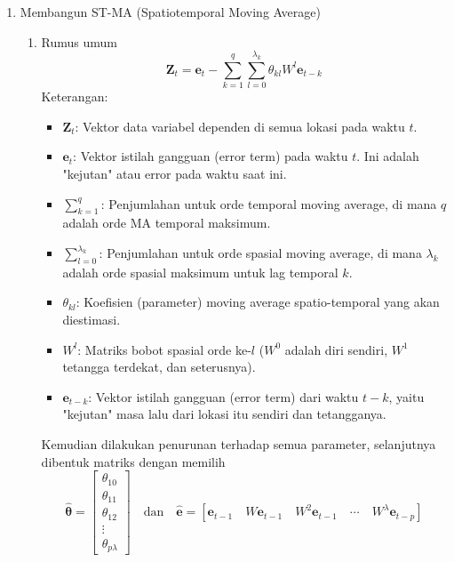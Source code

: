 \begin{enumerate}
\begin{enumerate}[label=\alph*)]
        \item Membangun ST-MA (Spatiotemporal Moving Average)
        \begin{enumerate}[label=\roman*)]
            \item Rumus umum
            \begin{equation}\label{st_ma}
                \mathbf{Z}_t = \mathbf{e}_t - \sum_{k=1}^{q} \sum_{l=0}^{\lambda_k} \theta_{kl} W^{l} \mathbf{e}_{t-k}
            \end{equation}
            Keterangan:
            \begin{itemize}
                \item $\mathbf{Z}_t$: Vektor data variabel dependen di semua lokasi pada waktu $t$.
                \item $\mathbf{e}_t$: Vektor istilah gangguan (error term) pada waktu $t$. Ini adalah "kejutan" atau error pada waktu saat ini.
                \item $\sum_{k=1}^{q}$: Penjumlahan untuk orde temporal moving average, di mana $q$ adalah orde MA temporal maksimum.
                \item $\sum_{l=0}^{\lambda_k}$: Penjumlahan untuk orde spasial moving average, di mana $\lambda_k$ adalah orde spasial maksimum untuk lag temporal $k$.
                \item $\theta_{kl}$: Koefisien (parameter) moving average spatio-temporal yang akan diestimasi.
                \item $W^l$: Matriks bobot spasial orde ke-$l$ ($W^0$ adalah diri sendiri, $W^1$ tetangga terdekat, dan seterusnya).
                \item $\mathbf{e}_{t-k}$: Vektor istilah gangguan (error term) dari waktu $t-k$, yaitu "kejutan" masa lalu dari lokasi itu sendiri dan tetangganya.
            \end{itemize}

            Kemudian dilakukan penurunan terhadap semua parameter, selanjutnya dibentuk matriks dengan memilih
            \begin{equation}\label{st_ma_matriks}
                \hat{\boldsymbol{\theta}} =
                \begin{bmatrix}
                \theta_{10} \\
                \theta_{11} \\
                \theta_{12} \\
                \vdots \\
                \theta_{p\lambda}
                \end{bmatrix}
                \quad \text{dan} \quad
                \hat{\mathbf{e}} = 
                \left[
                \mathbf{e}_{t-1} \quad
                W \mathbf{e}_{t-1} \quad
                W^2 \mathbf{e}_{t-1} \quad
                \cdots \quad
                W^{\lambda} \mathbf{e}_{t-p}
                \right]
            \end{equation}


\end{enumerate}
\end{enumerate}
\end{enumerate}
